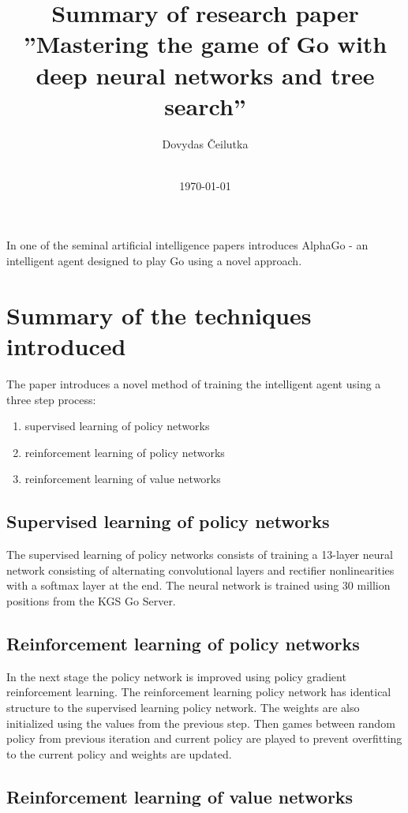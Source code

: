 \documentclass[11pt]{article}
\title{\vspace{-2.0cm}\textbf{Summary of research paper \\ ''Mastering the game of Go with deep neural networks and tree search''}}
\author{Dovydas Čeilutka\\\\}
\date{\today}
\begin{document}
\maketitle

In one of the seminal artificial intelligence papers \autocite{Silver_Nature2016} introduces AlphaGo - an intelligent agent designed to play Go using a novel approach.

\section{Summary of the techniques introduced}

The paper \autocite{Silver_Nature2016} introduces a novel method of training the intelligent agent using a three step process: 

\begin{enumerate}
  \item supervised learning of policy networks
  \item reinforcement learning of policy networks
  \item reinforcement learning of value networks
\end{enumerate}

\subsection{Supervised learning of policy networks}

The supervised learning of policy networks consists of training a 13-layer neural network consisting of alternating convolutional layers and rectifier nonlinearities with a softmax layer at the end. The neural network is trained using 30 million positions from the KGS Go Server.

\subsection{Reinforcement learning of policy networks}

In the next stage the policy network is improved using policy gradient reinforcement learning. The reinforcement learning policy network has identical structure to the supervised learning policy network. The weights are also initialized using the values from the previous step. Then games between random policy from previous iteration and current policy are played to prevent overfitting to the current policy and weights are updated.

\subsection{Reinforcement learning of value networks}
\end{document}
